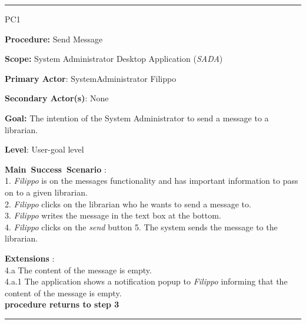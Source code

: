 \vspace{0.5cm}
\hrule
\begin{lyxlist}{PC1}
\small{
\item [\textbf{Procedure:}] Send Message
\item [\textbf{Scope:}] System Administrator Desktop Application (\emph{SADA})
\item [\textbf{Primary Actor}:] SystemAdministrator Filippo
\item [\textbf{Secondary Actor(s)}:] None
\item [\textbf{Goal:}] The intention of the System Administrator to send a
message to a librarian.
\item [\textbf{Level}:] User-goal level
\item [\textbf{Main~Success~Scenario}]:\\
1. \emph{Filippo} is on the messages functionality and has important
information to pass on to a given librarian.
\\
2. \emph{Filippo} clicks on the librarian who he wants to send a message to. \\
3. \emph{Filippo} writes the message in the text box at the bottom. \\
4. \emph{Filippo} clicks on the \emph{send} button
5. The system sends the message to the librarian. \\


\item [\textbf{Extensions}]: \\
4.a The content of the message is empty.\\
\hspace*{0.5cm} 4.a.1 The application shows a notification popup to
\emph{Filippo} informing that the content of the message is empty. \\
\hspace*{0.5cm} \textbf{procedure returns to step 3}
}
\end{lyxlist}
\hrule


